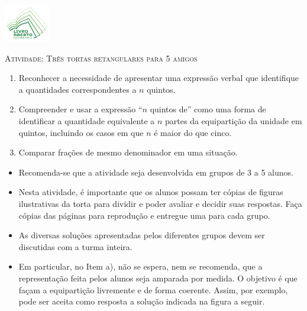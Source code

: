 \documentclass[10 pt,usenames,dvipsnames, oneside]{article}
\begin{document}
\begin{center}
  \begin{minipage}[l]{3cm}
\includegraphics[width=2cm]{../../../Figuras/logo}       
\end{minipage}\hfill
\begin{minipage}[r]{.8\textwidth}
 {\Large \scshape Atividade: Três tortas retangulares para 5 amigos}  
\end{minipage}
\end{center}
\vspace{.2cm}

\ifdefined\prof
\begin{goals}
\begin{enumerate}

\item Reconhecer a necessidade de apresentar uma expressão verbal que identifique a quantidades correspondentes a $n$ quintos.
\item Compreender e usar a expressão ``$n$ quintos de'' como uma forma de identificar a quantidade equivalente a $n$ partes da equipartição da unidade em quintos, incluindo os casos em que $n$ é maior do que cinco.
\item Comparar frações de mesmo denominador em uma situação.

\end{enumerate}
\tcblower

  \begin{itemize} %
  \item Recomenda-se que a atividade seja desenvolvida em grupos de 3 a 5 alunos.
  \item Nesta atividade, é importante que os alunos possam ter cópias de figuras ilustrativas da torta para dividir e poder avaliar e decidir suas respostas. Faça cópias das páginas para reprodução e entregue uma para cada grupo.
  \item       As diversas soluções apresentadas pelos diferentes grupos devem ser discutidas com a turma inteira.
  \item       Em particular, no Item a), não se espera, nem se recomenda, que a representação feita pelos alunos seja amparada por medida. O objetivo é que façam a equipartição livremente e de forma coerente. Assim, por exemplo, pode ser aceita como resposta a solução indicada na figura a seguir.



\end{itemize}
\end{goals}
\end{document}
